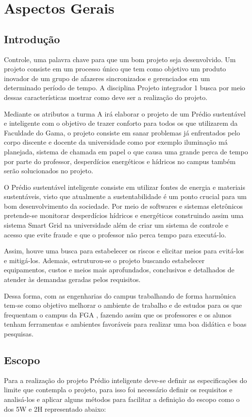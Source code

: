 \part{Aspectos Gerais}
\chapter[Introdução]{Introdução}
Controle, uma palavra chave para que um bom projeto seja desenvolvido. Um projeto consiste em um processo único que tem como objetivo um produto inovador de um grupo de afazeres sincronizados e gerenciados em um determinado período de tempo. A disciplina Projeto integrador 1 busca por meio dessas características mostrar como deve ser a realização do projeto.

Mediante os atributos a turma A irá elaborar o projeto de um Prédio sustentável e inteligente com o objetivo de trazer conforto para todos os que utilizarem da Faculdade do Gama, o projeto consiste em sanar problemas já enfrentados pelo corpo discente e docente da universidade como por exemplo iluminação má planejada, sistema de chamada em papel o que causa uma grande perca de tempo por parte do professor, desperdícios energéticos e hídricos no campus também serão solucionados no projeto.

O Prédio sustentável inteligente consiste em utilizar fontes de  energia e materiais sustentáveis, visto que atualmente a sustentabilidade é um ponto crucial para um bom desenvolvimento da sociedade. Por meio de softwares e sistemas eletrônicos pretende-se monitorar desperdícios hídricos e energéticos construindo assim uma sistema Smart Grid na universidade além de criar um sistema de controle e acesso que evite fraude e que o professor não perca tempo para executá-lo.

Assim, houve uma busca para estabelecer os riscos e elicitar meios para evitá-los e mitigá-los. Ademais, estruturou-se o projeto buscando estabelecer equipamentos, custos e meios mais aprofundados, conclusivos e detalhados de atender às demandas geradas pelos requisitos.

Dessa forma, com as engenharias do campus trabalhando de forma harmônica tem-se como objetivo melhorar o ambiente de trabalho e de estudos para os que frequentam o campus da FGA , fazendo assim que os professores e os alunos tenham ferramentas e ambientes favoráveis para realizar uma boa didática e boas pesquisas.


\chapter{Escopo}
Para a realização do projeto Prédio inteligente deve-se definir as especificações do limite que contempla o projeto, para isso foi necessário definir os requisitos e analisá-los e aplicar alguns métodos para facilitar a definição do escopo como o dos 5W e 2H representado abaixo:

